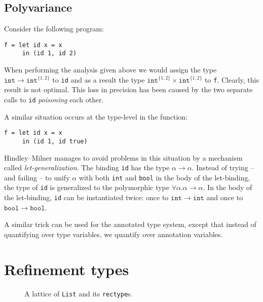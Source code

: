 \documentclass[a4paper]{report}
\begin{document}
\subsection{Polyvariance}



Consider the following program:
\begin{verbatim}
f = let id x = x
     in (id 1, id 2)
\end{verbatim}

When performing the analysis given above we would assign the type $\mathtt{int} \to \mathtt{int}^{\{1, 2\}}$ to {\tt id} and as a result the type $\mathtt{int}^{\{1,2\}} \times \mathtt{int}^{\{1,2\}}$ to {\tt f}. Clearly, this result is not optimal. This loss in precision has been caused by the two separate calls to {\tt id} \emph{poisoning} each other.

A similar situation occurs at the type-level in the function:
\begin{verbatim}
f = let id x = x
     in (id 1, id true)
\end{verbatim}
Hindley--Milner manages to avoid problems in this situation by a mechanism called \emph{let-generalization}. The binding {\tt id} has the type $\alpha \to \alpha$. Instead of trying -- and failing -- to unify $\alpha$ with both {\tt int} and {\tt bool} in the body of the let-binding, the type of {\tt id} is generalized to the polymorphic type $\forall \alpha. \alpha \to \alpha$. In the body of the let-binding, {\tt id} can be instantiated twice: once to $\mathtt{int} \to \mathtt{int}$ and once to $\mathtt{bool} \to \mathtt{bool}$.

A similar trick can be used for the annotated type system, except that instead of quantifying over type variables, we quantify over annotation variables. 

\section{Refinement types}

\begin{figure}[t]
\centering
{}
\caption{A lattice of {\tt List} and its {\tt rectype}s.}
\label{listlattice}
\end{figure}
\end{document}

